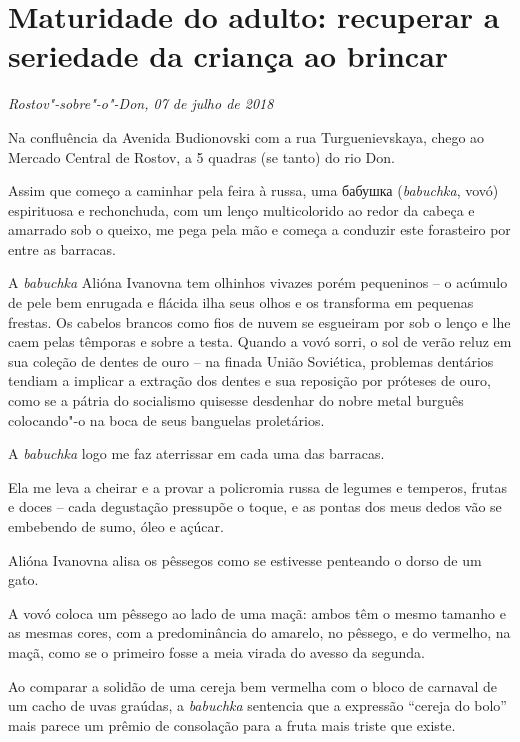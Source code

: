 \chapter*{Maturidade do adulto: recuperar a seriedade da criança ao brincar}

\begin{flushright}
\emph{Rostov"-sobre"-o"-Don, 07 de julho de 2018}
\end{flushright}

Na confluência da Avenida Budionovski com a rua Turguenievskaya, chego
ao Mercado Central de Rostov, a 5 quadras (se tanto) do rio Don.

Assim que começo a caminhar pela feira à russa, uma бабушка
(\emph{babuchka}, vovó) espirituosa e rechonchuda, com um lenço
multicolorido ao redor da cabeça e amarrado sob o queixo, me pega pela
mão e começa a conduzir este forasteiro por entre as barracas.

A \emph{babuchka} Alióna Ivanovna tem olhinhos vivazes porém pequeninos
-- o acúmulo de pele bem enrugada e flácida ilha seus olhos e os
transforma em pequenas frestas. Os cabelos brancos como fios de nuvem se
esgueiram por sob o lenço e lhe caem pelas têmporas e sobre a testa.
Quando a vovó sorri, o sol de verão reluz em sua coleção de dentes de
ouro -- na finada União Soviética, problemas dentários tendiam a
implicar a extração dos dentes e sua reposição por próteses de ouro,
como se a pátria do socialismo quisesse desdenhar do nobre metal burguês
colocando"-o na boca de seus banguelas proletários.

A \emph{babuchka} logo me faz aterrissar em cada uma das barracas.

Ela me leva a cheirar e a provar a policromia russa de legumes e
temperos, frutas e doces -- cada degustação pressupõe o toque, e as
pontas dos meus dedos vão se embebendo de sumo, óleo e açúcar.

Alióna Ivanovna alisa os pêssegos como se estivesse penteando o dorso de
um gato.

A vovó coloca um pêssego ao lado de uma maçã: ambos têm o mesmo tamanho
e as mesmas cores, com a predominância do amarelo, no pêssego, e do
vermelho, na maçã, como se o primeiro fosse a meia virada do avesso da
segunda.

Ao comparar a solidão de uma cereja bem vermelha com o bloco de carnaval
de um cacho de uvas graúdas, a \emph{babuchka} sentencia que a expressão
``cereja do bolo'' mais parece um prêmio de consolação para a fruta mais
triste que existe.

